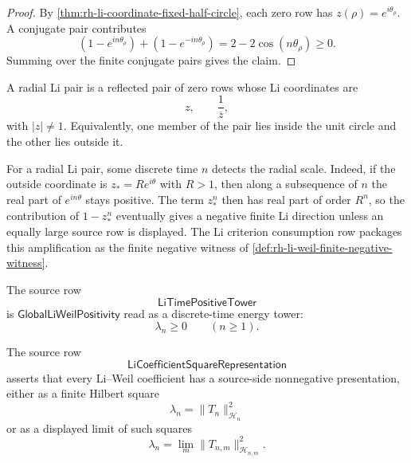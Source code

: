 \begin{proof}
By \autoref{thm:rh-li-coordinate-fixed-half-circle}, each zero row has
$z(\rho)=e^{i\theta_\rho}$.  A conjugate pair contributes
$$
\left(1-e^{in\theta_\rho}\right)
+
\left(1-e^{-in\theta_\rho}\right)
=
2-2\cos(n\theta_\rho)
\ge0.
$$
Summing over the finite conjugate pairs gives the claim.
\end{proof}

\begin{definition}
\label{def:rh-radial-li-pair}
A radial Li pair is a reflected pair of zero rows whose Li coordinates
are
$$
z,
\qquad
\frac{1}{\overline z},
$$
with $|z|\ne1$.  Equivalently, one member of the pair lies inside the
unit circle and the other lies outside it.
\end{definition}

\begin{principle}
\label{prin:rh-radial-li-time-amplification}
For a radial Li pair, some discrete time $n$ detects the radial scale.
Indeed, if the outside coordinate is $z_\ast=Re^{i\theta}$ with
$R>1$, then along a subsequence of $n$ the real part of
$e^{in\theta}$ stays positive.  The term $z_\ast^n$ then has real part
of order $R^n$, so the contribution of $1-z_\ast^n$ eventually gives a
negative finite Li direction unless an equally large source row is
displayed.  The Li criterion consumption row packages this amplification
as the finite negative witness of
\autoref{def:rh-li-weil-finite-negative-witness}.
\end{principle}

\begin{definition}
\label{def:rh-li-time-positive-tower}
The source row
$$
\mathsf{LiTimePositiveTower}
$$
is $\mathsf{GlobalLiWeilPositivity}$ read as a discrete-time energy
tower:
$$
\lambda_n\ge0
\qquad
(n\ge1).
$$
\end{definition}

\begin{definition}
\label{def:rh-li-coefficient-square-representation}
The source row
$$
\mathsf{LiCoefficientSquareRepresentation}
$$
asserts that every Li--Weil coefficient has a source-side nonnegative
presentation, either as a finite Hilbert square
$$
\lambda_n=\|T_n\|_{\mathcal H_n}^2
$$
or as a displayed limit of such squares
$$
\lambda_n=\lim_m\|T_{n,m}\|_{\mathcal H_{n,m}}^2.
$$
\end{definition}

